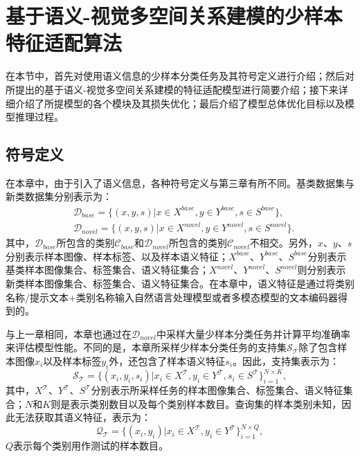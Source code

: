 \section[\hspace{-2pt}基于语义-视觉多空间关系建模的少样本特征适配算法]{{\heiti{} \hspace{-8pt}基于语义-视觉多空间关系建模的少样本特征适配算法}}\label{section4: 基于语义-视觉多空间关系建模的少样本特征适配算法}

在本节中，首先对使用语义信息的少样本分类任务及其符号定义进行介绍；然后对所提出的基于语义-视觉多空间关系建模的特征适配模型进行简要介绍；接下来详细介绍了所提模型的各个模块及其损失优化；最后介绍了模型总体优化目标以及模型推理过程。

\subsection[\hspace{-2pt}符号定义]{{\heiti{} \hspace{-8pt}符号定义}}\label{section4: 符号定义}

在本章中，由于引入了语义信息，各种符号定义与第三章有所不同。基类数据集与新类数据集分别表示为：
\begin{equation}
\begin{aligned}
  &\mathcal{D}_{base} = \{(x, y, s)|x \in X^{base}, y \in Y^{base}, s \in S^{base}\},\\
  &\mathcal{D}_{novel} = \{(x, y, s)|x \in X^{novel}, y \in Y^{novel}, s \in S^{novel}\}.
\end{aligned}
\end{equation}
其中，$\mathcal{D}_{base}$所包含的类别$\mathcal{C}_{base}$和$\mathcal{D}_{novel}$所包含的类别$\mathcal{C}_{novel}$不相交。另外，$x$、$y$、$s$分别表示样本图像、样本标签、以及样本语义特征；$X^{base}$、$Y^{base}$、$S^{base}$分别表示基类样本图像集合、标签集合、语义特征集合；$X^{novel}$、$Y^{novel}$、$S^{novel}$则分别表示新类样本图像集合、标签集合、语义特征集合。在本章中，语义特征是通过将类别名称/提示文本+类别名称输入自然语言处理模型或者多模态模型的文本编码器得到的。

与上一章相同，本章也通过在$\mathcal{D}_{novel}$中采样大量少样本分类任务并计算平均准确率来评估模型性能。不同的是，本章所采样少样本分类任务的支持集$\mathcal{S}_{\mathcal{T}}$除了包含样本图像$x_i$以及样本标签$y_i$外，还包含了样本语义特征$s_i$。因此，支持集表示为：
\begin{equation}
  \mathcal{S}_{\mathcal{T}} = \{(x_i, y_i, s_i)|x_i \in X^{\mathcal{T}}, y_i \in Y^{\mathcal{T}}, s_i \in S^{\mathcal{T}}\}_{i=1}^{N \times K},
\end{equation}
其中，$X^{\mathcal{T}}$、$Y^{\mathcal{T}}$、$S^{\mathcal{T}}$分别表示所采样任务的样本图像集合、标签集合、语义特征集合；$N$和$K$则是表示类别数目以及每个类别样本数目。查询集的样本类别未知，因此无法获取其语义特征，表示为：
\begin{equation}
  \mathcal{Q}_{\mathcal{T}} = \{(x_i, y_i)|x_i \in X^{\mathcal{T}}, y_i \in Y^{\mathcal{T}}\}_{i=1}^{N \times Q},
\end{equation}
$Q$表示每个类别用作测试的样本数目。

